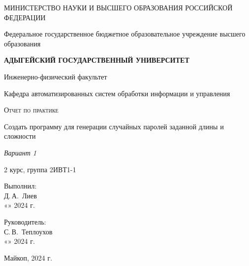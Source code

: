 \documentclass[12pt,a4paper]{scrartcl}
\begin{document}
 \begin{titlepage}
  \begin{center}
   \large
   МИНИСТЕРСТВО НАУКИ И ВЫСШЕГО ОБРАЗОВАНИЯ РОССИЙСКОЙ ФЕДЕРАЦИИ
   
   Федеральное государственное бюджетное образовательное учреждение высшего образования
   
   \textbf{АДЫГЕЙСКИЙ ГОСУДАРСТВЕННЫЙ УНИВЕРСИТЕТ}
   \vspace{0.25cm}
   
   Инженерно-физический факультет
   
   Кафедра автоматизированных систем обработки информации и управления
   \vfill

   \vfill
   
   \textsc{Отчет по практике}\\[2mm]
   
   {\LARGE Создать программу для генерации случайных паролей заданной длины и сложности
    \vspace{0.25cm}
   
   \textit{Вариант 1}}
   \bigskip
   
   2 курс, группа 2ИВТ1-1
  \end{center}
  \vfill
  
  \newlength{\ML}
  \hfill\begin{minipage}{0.5\textwidth}
   Выполнил:\\
   \underline{\hspace{\ML}} Д.\,А.~Лиев\\
   «\underline{\hspace{0.7cm}}» \underline{\hspace{2cm}} 2024 г.
  \end{minipage}%
  \bigskip
  
  \hfill\begin{minipage}{0.5\textwidth}
   Руководитель:\\
   \underline{\hspace{\ML}} С.\,В.~Теплоухов\\
   «\underline{\hspace{0.7cm}}» \underline{\hspace{2cm}} 2024 г.
  \end{minipage}%
  \vfill
  
  \begin{center}
   Майкоп, 2024 г.
  \end{center}
 \end{titlepage}
 
\end{document}
